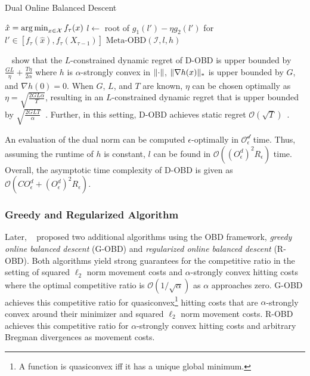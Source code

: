 \begin{algorithm}
    \caption{Dual Online Balanced Descent~\cite{Goel2018}}\label{alg:md:dobd}
    $\hat{x} = \operatorname*{arg\,min}_{x \in \mathcal{X}} f_{\tau}(x)$\;
    $l \gets $ root of $g_1(l') - \eta g_2(l')$ for $l' \in [f_{\tau}(\hat{x}), f_{\tau}(X_{\tau-1})]$\;
    \Return $\text{Meta-OBD}(\mathcal{I}, l, h)$\;
\end{algorithm}

\citeauthor*{Goel2018}~\cite{Goel2018} show that the $L$-constrained dynamic regret of D-OBD is upper bounded by $\frac{G L}{\eta} + \frac{T \eta}{2 \alpha}$ where $h$ is $\alpha$-strongly convex in $\lVert\cdot\rVert$, $\lVert\nabla h(x)\rVert_*$ is upper bounded by $G$, and $\nabla h(0) = 0$. When $G$, $L$, and $T$ are known, $\eta$ can be chosen optimally as $\eta = \sqrt{\frac{2 G L \alpha}{T}}$, resulting in an $L$-constrained dynamic regret that is upper bounded by $\sqrt{\frac{2 G L T}{\alpha}}$~\cite{Goel2018}. Further, in this setting, D-OBD achieves static regret $\mathcal{O}(\sqrt{T})$~\cite{Goel2018}.

An evaluation of the dual norm can be computed $\epsilon$-optimally in $\mathcal{O_{\epsilon}^d}$ time. Thus, assuming the runtime of $h$ is constant, $l$ can be found in $\mathcal{O}((O_{\epsilon}^d)^2 R_{\epsilon})$ time. Overall, the asymptotic time complexity of D-OBD is given as $\mathcal{O}(C O_{\epsilon}^d + (O_{\epsilon}^d)^2 R_{\epsilon})$.

\subsubsection{Greedy and Regularized Algorithm}

Later, \citeauthor*{Goel2019}~\cite{Goel2019} proposed two additional algorithms using the OBD framework, \emph{greedy online balanced descent} (G-OBD) and \emph{regularized online balanced descent} (R-OBD). Both algorithms yield strong guarantees for the competitive ratio in the setting of squared $\ell_2$ norm movement costs and $\alpha$-strongly convex hitting costs where the optimal competitive ratio is $\mathcal{O}(1 / \sqrt{\alpha})$ as $\alpha$ approaches zero. G-OBD achieves this competitive ratio for quasiconvex\footnote{A function is quasiconvex iff it has a unique global minimum.} hitting costs that are $\alpha$-strongly convex around their minimizer and squared $\ell_2$ norm movement costs. R-OBD achieves this competitive ratio for $\alpha$-strongly convex hitting costs and arbitrary Bregman divergences as movement costs.

